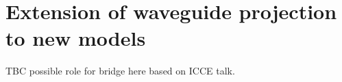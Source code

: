\chapter{Extension of waveguide projection to new models}

TBC possible role for bridge here based on ICCE talk.
